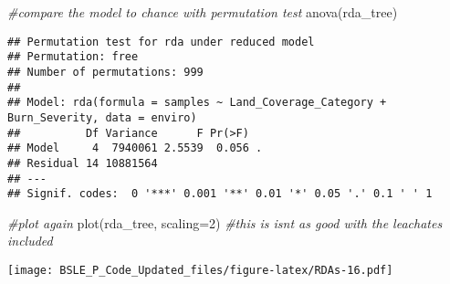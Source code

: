 \documentclass[
]{article}
\newenvironment{Shaded}{\begin{snugshade}}{\end{snugshade}}
\newcommand{\AttributeTok}[1]{\textcolor[rgb]{0.77,0.63,0.00}{#1}}
\newcommand{\CommentTok}[1]{\textcolor[rgb]{0.56,0.35,0.01}{\textit{#1}}}
\newcommand{\DecValTok}[1]{\textcolor[rgb]{0.00,0.00,0.81}{#1}}
\newcommand{\FunctionTok}[1]{\textcolor[rgb]{0.00,0.00,0.00}{#1}}
\newcommand{\NormalTok}[1]{#1}
\begin{document}
\begin{Shaded}
\begin{Highlighting}[]
\CommentTok{\#compare the model to chance with permutation test}
\FunctionTok{anova}\NormalTok{(rda\_tree)}
\end{Highlighting}
\end{Shaded}

\begin{verbatim}
## Permutation test for rda under reduced model
## Permutation: free
## Number of permutations: 999
## 
## Model: rda(formula = samples ~ Land_Coverage_Category + Burn_Severity, data = enviro)
##          Df Variance      F Pr(>F)  
## Model     4  7940061 2.5539  0.056 .
## Residual 14 10881564                
## ---
## Signif. codes:  0 '***' 0.001 '**' 0.01 '*' 0.05 '.' 0.1 ' ' 1
\end{verbatim}

\begin{Shaded}
\begin{Highlighting}[]
\CommentTok{\#plot again}
\FunctionTok{plot}\NormalTok{(rda\_tree, }\AttributeTok{scaling=}\DecValTok{2}\NormalTok{) }\CommentTok{\#this is isn\textquotesingle{}t as good with the leachates included}
\end{Highlighting}
\end{Shaded}

\texttt{[image: BSLE\_P\_Code\_Updated\_files/figure-latex/RDAs-16.pdf]}
\end{document}
